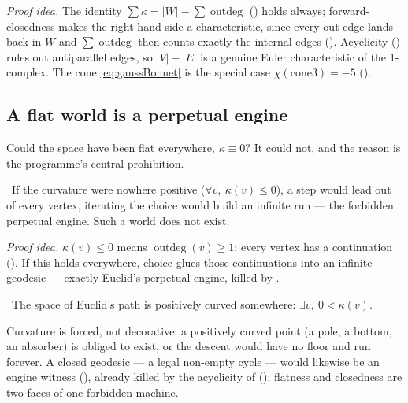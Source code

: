 \emph{Proof idea.} The identity $\sum\kappa = |W| - \sum\operatorname{outdeg}$ ()
holds always; forward-closedness makes the right-hand side a characteristic, since every out-edge lands
back in $W$ and $\sum\operatorname{outdeg}$ then counts exactly the internal edges
(). Acyclicity () rules out antiparallel
edges, so $|V| - |E|$ is a genuine Euler characteristic of the $1$-complex. The cone
\cref{eq:gaussBonnet} is the special case $\chi(\mathrm{cone3}) = -5$ ().

\subsection{A flat world is a perpetual engine}

Could the space have been flat everywhere, $\kappa \equiv 0$? It could not, and the reason is the
programme's central prohibition.

\begin{theorem}\label{thm:nonpositive_curvature_forces_engine}
\green{}\ If the curvature were nowhere positive ($\forall v,\ \kappa(v) \le 0$), a step would lead out
of every vertex, iterating the choice would build an infinite run --- the forbidden perpetual engine.
Such a world does not exist. 
\end{theorem}

\emph{Proof idea.} $\kappa(v) \le 0$ means $\operatorname{outdeg}(v) \ge 1$: every vertex has a
continuation (). If this holds everywhere, choice glues those
continuations into an infinite geodesic --- exactly Euclid's perpetual engine, killed by
.

\begin{theorem}\label{thm:space_positively_curved_somewhere}
\green{}\ The space of Euclid's path is positively curved somewhere: $\exists v,\ 0 < \kappa(v)$.
\end{theorem}

Curvature is forced, not decorative: a positively curved point (a pole, a bottom, an absorber) is
obliged to exist, or the descent would have no floor and run forever. A closed geodesic --- a legal
non-empty cycle --- would likewise be an engine witness (),
already killed by the acyclicity of  (); flatness and
closedness are two faces of one forbidden machine.

